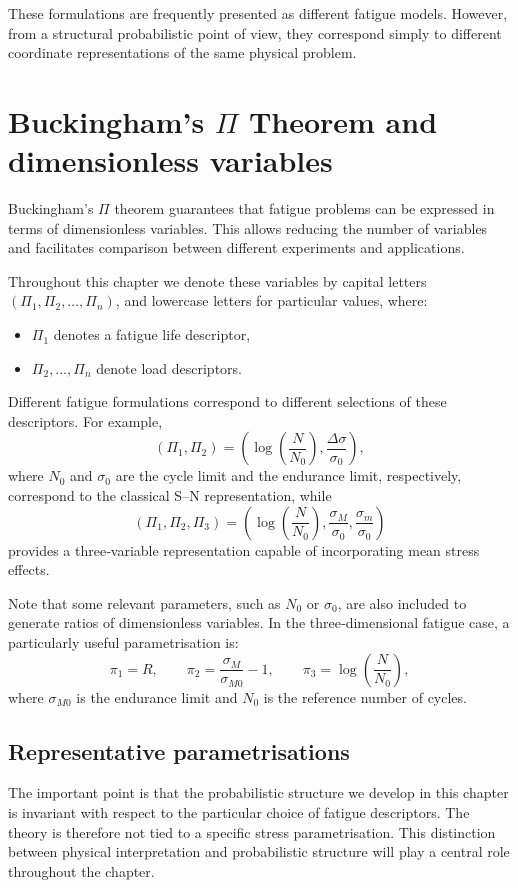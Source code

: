 These formulations are frequently presented as different fatigue models. However, from a structural probabilistic point of view, they correspond simply to different coordinate representations of the same physical problem.

\section{Buckingham’s $\Pi$ Theorem and dimensionless variables}

Buckingham’s $\Pi$ theorem guarantees that fatigue problems can be expressed in terms of dimensionless variables. This allows reducing the number of variables and facilitates comparison between different experiments and applications.

Throughout this chapter we denote these variables by capital letters $(\Pi_1,\Pi_2,\ldots,\Pi_n)$, and lowercase letters for particular values, where:
\begin{itemize}
    \item $\Pi_1$ denotes a fatigue life descriptor,
    \item $\Pi_2,\ldots,\Pi_n$ denote load descriptors.
\end{itemize}

Different fatigue formulations correspond to different selections of these descriptors. For example,
\[
(\Pi_1,\Pi_2)=\left(\log\left(\frac{N}{N_0}\right),\frac{\Delta\sigma}{\sigma_0}\right),
\]
where $N_0$ and $\sigma_0$ are the cycle limit and the endurance limit, respectively, correspond to the classical S–N representation, while
\[
(\Pi_1,\Pi_2,\Pi_3)=\left(\log\left(\frac{N}{N_0}\right),\frac{\sigma_M}{\sigma_0},\frac{\sigma_m}{\sigma_0}\right)
\]
provides a three‑variable representation capable of incorporating mean stress effects.

Note that some relevant parameters, such as $N_0$ or $\sigma_0$, are also included to generate ratios of dimensionless variables. In the three‑dimensional fatigue case, a particularly useful parametrisation is:
\[
\pi_1 = R,\qquad \pi_2 = \frac{\sigma_M}{\sigma_{M0}} - 1,\qquad \pi_3 = \log\left(\frac{N}{N_0}\right),
\]
where $\sigma_{M0}$ is the endurance limit and $N_0$ is the reference number of cycles.

\subsection{Representative parametrisations}

The important point is that the probabilistic structure we develop in this chapter is invariant with respect to the particular choice of fatigue descriptors. The theory is therefore not tied to a specific stress parametrisation. This distinction between physical interpretation and probabilistic structure will play a central role throughout the chapter.

